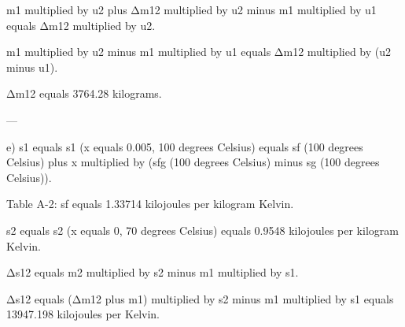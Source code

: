 m1 multiplied by u2 plus Δm12 multiplied by u2 minus m1 multiplied by u1 equals Δm12 multiplied by u2.  

m1 multiplied by u2 minus m1 multiplied by u1 equals Δm12 multiplied by (u2 minus u1).  

Δm12 equals 3764.28 kilograms.  

---

e)  
s1 equals s1 (x equals 0.005, 100 degrees Celsius) equals sf (100 degrees Celsius) plus x multiplied by (sfg (100 degrees Celsius) minus sg (100 degrees Celsius)).  

Table A-2: sf equals 1.33714 kilojoules per kilogram Kelvin.  

s2 equals s2 (x equals 0, 70 degrees Celsius) equals 0.9548 kilojoules per kilogram Kelvin.  

Δs12 equals m2 multiplied by s2 minus m1 multiplied by s1.  

Δs12 equals (Δm12 plus m1) multiplied by s2 minus m1 multiplied by s1 equals 13947.198 kilojoules per Kelvin.